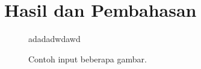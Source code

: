 \section{Hasil dan Pembahasan}
\label{sec:hasildanpembahasan}


\begin{figure*}
    \centering
    \hfil
    \caption{Contoh input beberapa gambar.}
    \label{fig:hasil}adadadwdawd
\end{figure*}

\lipsum[16-18]



\lipsum[19-20]